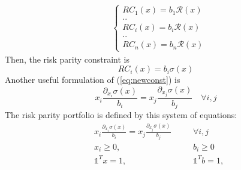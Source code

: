 \begin{equation}\label{eq:1}
\begin{aligned}
&\begin{cases}
RC_1(x) = b_1 \mathcal{R}(x)\\
..\\
RC_i(x) = b_i \mathcal{R}(x)\\
..\\
RC_n(x) = b_n \mathcal{R}(x)
\end{cases}
\end{aligned}
\end{equation} Then, the risk parity constraint is
\begin{equation}\label{eq:newconst}
RC_i(x) = b_i \sigma (x)
\end{equation}
Another useful formulation of (\ref{eq:newconst}) is
\begin{equation}\label{eq:newconst1}
x_i \frac{\partial_{x_i} \sigma (x)}{b_i} = x_j \frac{\partial_{x_j} \sigma (x)}{b_j} \hspace{1em} \forall i,j
\end{equation}
The risk parity portfolio \cite{roncalli} is defined by this system of equations:
\begin{equation}\label{eq:rb}
\begin{aligned}
&x_i \frac{\partial_{x_i} \sigma (x)}{b_i} = x_j \frac{\partial_{x_j} \sigma (x)}{b_j} \hspace{1em} &&\forall i,j\\
&x_i \geq 0,  &&b_i \geq 0 \\
&\mathds{1}^T x = 1,  &&\mathds{1}^T b = 1, 
\end{aligned}
\end{equation}

